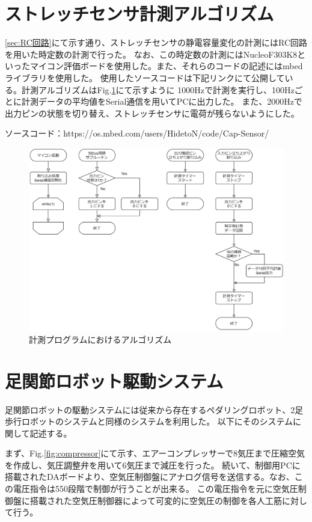 \section{ストレッチセンサ計測アルゴリズム}
\ref{sec:RC回路}にて示す通り、ストレッチセンサの静電容量変化の計測にはRC回路を用いた時定数の計測で行った。
なお、この時定数の計測にはNucleoF303K8といったマイコン評価ボードを使用した。また、それらのコードの記述にはmbedライブラリを使用した。
使用したソースコードは下記リンクにて公開している。計測アルゴリズムはFig.\ref{fig:algorithm}にて示すように
1000Hzで計測を実行し、100Hzごとに計測データの平均値をSerial通信を用いてPCに出力した。
また、2000Hzで出力ピンの状態を切り替え、ストレッチセンサに電荷が残らないようにした。

ソースコード：https://os.mbed.com/users/HidetoN/code/Cap-Sensor/

\begin{figure}[h]
    \begin{center}
     \includegraphics[width=0.9\columnwidth,clip]{./3_analysis/algorithm.eps}
     \caption{計測プログラムにおけるアルゴリズム}
     \label{fig:algorithm}
    \end{center}
\end{figure}

\section{足関節ロボット駆動システム}
足関節ロボットの駆動システムには従来から存在するペダリングロボット、2足歩行ロボットのシステムと同様のシステムを利用した。
以下にそのシステムに関して記述する。

まず、Fig.\ref{fig:compressor}にて示す、エアーコンプレッサーで8気圧まで圧縮空気を作成し、気圧調整弁を用いて6気圧まで減圧を行った。
続いて、制御用PCに搭載されたDAボードより、空気圧制御盤にアナログ信号を送信する。なお、この電圧指令は550段階で制御が行うことが出来る。
この電圧指令を元に空気圧制御盤に搭載された空気圧制御器によって可変的に空気圧の制御を各人工筋に対して行う。

